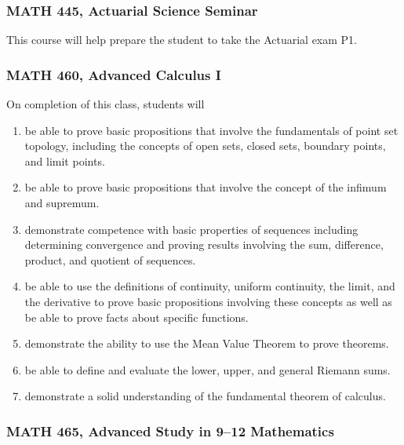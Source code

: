 \documentclass[11pt]{article}
\newenvironment{alphalist}{
\begin{enumerate}[label=(\arabic*),widest=107 ,leftmargin=25pt, itemsep=0pt]}
{\end{enumerate}}
\begin{document}
\subsubsection{MATH 445, Actuarial Science Seminar}

This course will help prepare the student to take the Actuarial exam P1.

\subsubsection{MATH 460, Advanced Calculus I}

On completion of this class, students will
\begin{alphalist}
    \item be able to prove basic propositions that involve the fundamentals of point set topology, including the concepts of open sets, closed sets, boundary points, and limit points.
     \item be able to prove basic propositions that involve the concept of the infimum and supremum. 
    \item demonstrate competence with basic properties of sequences including determining convergence and proving results involving the sum, difference, product, and quotient of sequences.
    \item be able to use the definitions of continuity, uniform continuity, the limit, and the derivative to prove basic propositions involving these concepts as well as be able to prove facts about specific functions.
    \item demonstrate the ability to use the Mean Value Theorem to prove theorems. 
    \item be able to define and evaluate the lower, upper, and general Riemann sums.
    \item demonstrate a solid understanding of the fundamental theorem of calculus.
\end{alphalist}

\subsubsection{MATH 465, Advanced Study in 9--12 Mathematics}
\end{document}
